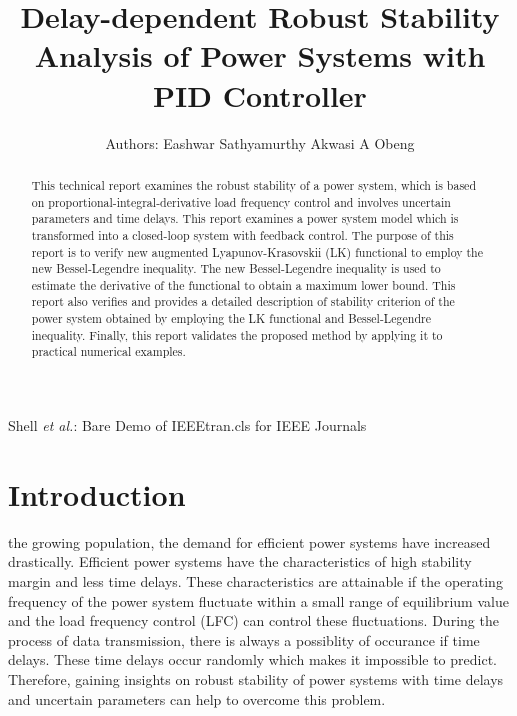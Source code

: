 \documentclass[journal]{IEEEtran}
\begin{document}
\title{Delay-dependent Robust Stability Analysis of Power Systems with PID Controller}

\author{ Authors: Eashwar Sathyamurthy  Akwasi A Obeng}
        
{Shell \MakeLowercase{\textit{et al.}}: Bare Demo of IEEEtran.cls for IEEE Journals}

\maketitle

\begin{abstract}
  This technical report examines the robust stability of a power system, which is based on proportional-integral-derivative load
frequency control and involves uncertain parameters and time delays. This report examines a power system model which  is transformed into a closed-loop system with feedback control. The purpose of this report is to verify new augmented Lyapunov-Krasovskii (LK)
functional to employ the new Bessel-Legendre inequality. The new Bessel-Legendre inequality is used to estimate the derivative of the functional to obtain
a maximum lower bound. This report also verifies and provides a detailed description of stability criterion of the power system obtained by employing the LK functional and Bessel-Legendre inequality. Finally,
this report validates the proposed method by applying it to practical numerical examples.
\end{abstract}
\section{Introduction}

 the growing population, the demand for efficient power systems have increased drastically. Efficient power systems have the characteristics of high stability margin and less time delays. These characteristics are attainable if the operating frequency of the power system fluctuate within a small range of equilibrium value and the load frequency control (LFC) can control these fluctuations. During the process of data transmission, there is always a possiblity of occurance if time delays. These time delays occur randomly which makes it impossible to predict.  Therefore, gaining insights on robust stability of power systems with time delays and uncertain parameters can help to overcome this problem. \\
\end{document}
